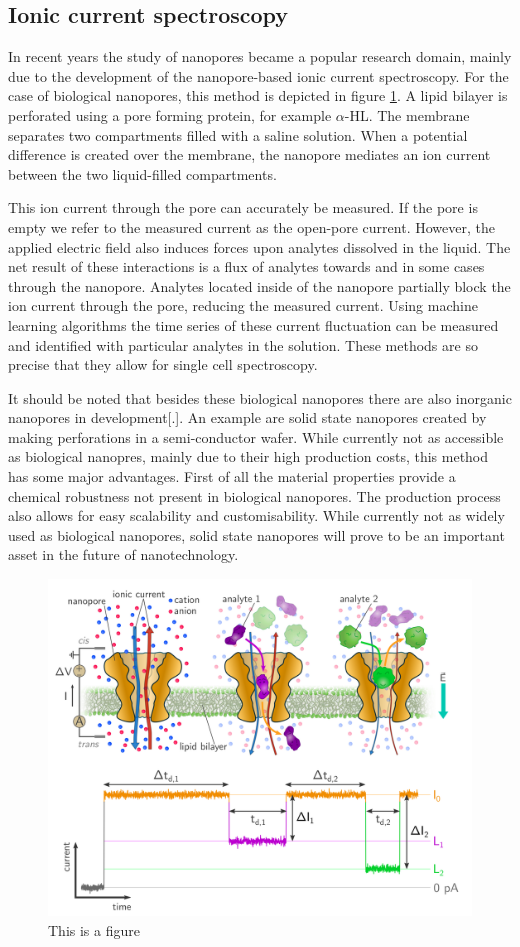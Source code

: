 \subsection{Ionic current spectroscopy}
In recent years the study of nanopores became a popular research domain, mainly
due to the development of the nanopore-based ionic current spectroscopy. For the case of
biological nanopores, this method is depicted in figure \ref{fig:IonicCurrentSpec}. A
lipid bilayer is perforated using a pore forming protein, for example $\alpha$-HL. The
membrane separates two compartments filled with a saline solution. When a potential
difference is created over the membrane, the nanopore mediates an ion current between the
two liquid-filled compartments.

This ion current through the pore can accurately be measured. If the pore is empty we
refer to the measured current as the open-pore current. However, the applied electric
field also induces forces upon analytes dissolved in the liquid. The net result of these
interactions is a flux of analytes towards and in some cases through the nanopore.
Analytes located inside of the nanopore partially block the ion current through the pore,
reducing the measured current. Using machine learning algorithms the time series of
these current fluctuation can be measured and identified with particular analytes in the
solution. These methods are so precise that they allow for single cell spectroscopy.

It should be noted that besides these biological nanopores there are also inorganic
nanopores in development[.]. An example are solid state nanopores created by making
perforations in a semi-conductor wafer. While currently not as accessible as biological
nanopres, mainly due to their high production costs, this method has some major
advantages.  First of all the material properties provide a chemical robustness not
present in biological nanopores. The production process also allows for easy scalability
and customisability. While currently not as widely used as biological nanopores, solid
state nanopores will prove to be an important asset in the future of nanotechnology.

\begin{figure}[htpb]
  \centering
  \includegraphics[width=0.6\linewidth]{Figures/IonicCurrentSpec.png}
  \caption{This is a figure}
  \label{fig:IonicCurrentSpec}
\end{figure}
